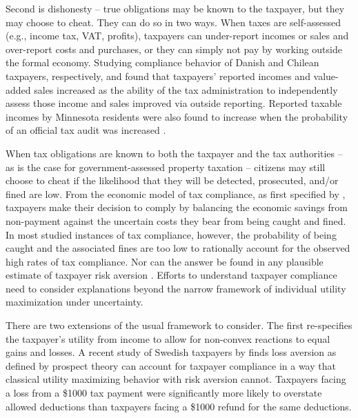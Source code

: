 \documentclass[12pt]{article}
\begin{document}
Second is dishonesty -- true obligations may be known to the taxpayer, but they may
choose to cheat.  They can do so in two ways.  When taxes are
self-assessed (e.g., income tax, VAT, profits), taxpayers can
under-report incomes or sales and over-report costs and purchases, or
they can simply not pay by working outside the formal economy.
Studying compliance behavior of Danish and Chilean taxpayers, respectively,
 and  found
that taxpayers' reported incomes and value-added sales increased as the
ability of the tax administration to independently assess those income
and sales improved via outside reporting.  Reported taxable incomes by
Minnesota residents were also found to increase when the probability
of an official tax audit was increased \cite{Slemrod-01}.

When tax obligations are known to both the taxpayer and the tax
authorities -- as is the case for government-assessed property
taxation -- citizens may still choose to cheat if the likelihood that they
will be detected, prosecuted, and/or fined are low.  From the economic
model of tax compliance, as first specified by
, taxpayers make their decision to comply
by balancing the economic savings from non-payment against the
uncertain costs they bear from being caught and fined.  In most
studied instances of tax compliance, however, the probability of being
caught and the associated fines are too low to rationally account for
the observed high rates of tax compliance.  Nor can the answer be
found in any plausible estimate of taxpayer risk aversion
\cite{Alm-92}. Efforts to understand taxpayer compliance need to
consider explanations beyond the narrow framework of individual
utility maximization under uncertainty.

There are two extensions of the usual framework to consider.  The
first re-specifies the taxpayer's utility from income to allow for
non-convex reactions to equal gains and losses.  A recent study of
Swedish taxpayers by  finds loss aversion as
defined by prospect theory can account for taxpayer compliance in a
way that classical utility maximizing behavior with risk aversion
cannot.  Taxpayers facing a loss from a \$1000 tax payment were
significantly more likely to overstate allowed deductions than
taxpayers facing a \$1000 refund for the same deductions.
\end{document}
